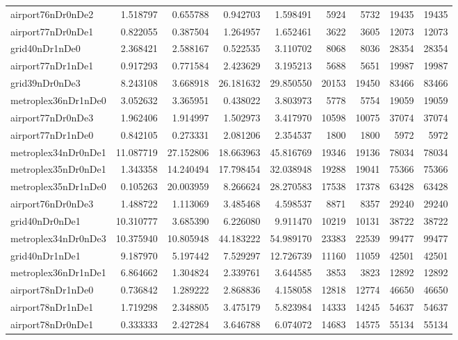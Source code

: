 \begin{longtable}{|l|r|r|r|r|r|r|r|r|}
airport76nDr0nDe2 & 1.518797 & 0.655788 & 0.942703 & 1.598491 & 5924 & 5732 & 19435 & 19435 \\
airport77nDr0nDe1 & 0.822055 & 0.387504 & 1.264957 & 1.652461 & 3622 & 3605 & 12073 & 12073 \\
grid40nDr1nDe0 & 2.368421 & 2.588167 & 0.522535 & 3.110702 & 8068 & 8036 & 28354 & 28354 \\
airport77nDr1nDe1 & 0.917293 & 0.771584 & 2.423629 & 3.195213 & 5688 & 5651 & 19987 & 19987 \\
grid39nDr0nDe3 & 8.243108 & 3.668918 & 26.181632 & 29.850550 & 20153 & 19450 & 83466 & 83466 \\
metroplex36nDr1nDe0 & 3.052632 & 3.365951 & 0.438022 & 3.803973 & 5778 & 5754 & 19059 & 19059 \\
airport77nDr0nDe3 & 1.962406 & 1.914997 & 1.502973 & 3.417970 & 10598 & 10075 & 37074 & 37074 \\
airport77nDr1nDe0 & 0.842105 & 0.273331 & 2.081206 & 2.354537 & 1800 & 1800 & 5972 & 5972 \\
metroplex34nDr0nDe1 & 11.087719 & 27.152806 & 18.663963 & 45.816769 & 19346 & 19136 & 78034 & 78034 \\
metroplex35nDr0nDe1 & 1.343358 & 14.240494 & 17.798454 & 32.038948 & 19288 & 19041 & 75366 & 75366 \\
metroplex35nDr1nDe0 & 0.105263 & 20.003959 & 8.266624 & 28.270583 & 17538 & 17378 & 63428 & 63428 \\
airport76nDr0nDe3 & 1.488722 & 1.113069 & 3.485468 & 4.598537 & 8871 & 8357 & 29240 & 29240 \\
grid40nDr0nDe1 & 10.310777 & 3.685390 & 6.226080 & 9.911470 & 10219 & 10131 & 38722 & 38722 \\
metroplex34nDr0nDe3 & 10.375940 & 10.805948 & 44.183222 & 54.989170 & 23383 & 22539 & 99477 & 99477 \\
grid40nDr1nDe1 & 9.187970 & 5.197442 & 7.529297 & 12.726739 & 11160 & 11059 & 42501 & 42501 \\
metroplex36nDr1nDe1 & 6.864662 & 1.304824 & 2.339761 & 3.644585 & 3853 & 3823 & 12892 & 12892 \\
airport78nDr1nDe0 & 0.736842 & 1.289222 & 2.868836 & 4.158058 & 12818 & 12774 & 46650 & 46650 \\
airport78nDr1nDe1 & 1.719298 & 2.348805 & 3.475179 & 5.823984 & 14333 & 14245 & 54637 & 54637 \\
airport78nDr0nDe1 & 0.333333 & 2.427284 & 3.646788 & 6.074072 & 14683 & 14575 & 55134 & 55134 \\

\end{longtable}
